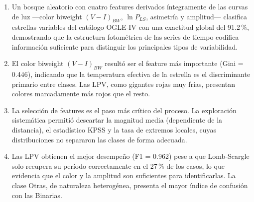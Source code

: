 \documentclass[letterpaper,12pt]{extarticle}
\begin{document}
\begin{enumerate}
    \item Un bosque aleatorio con cuatro features derivados íntegramente de las
    curvas de luz ---color biweight $(V-I)_{BW}$, $\ln P_{LS}$, asimetría y
    amplitud--- clasifica estrellas variables del catálogo OGLE-IV con una
    exactitud global del 91.2\,\%, demostrando que la estructura fotométrica de
    las series de tiempo codifica información suficiente para distinguir los
    principales tipos de variabilidad.

    \item El color biweight $(V-I)_{BW}$ resultó ser el feature más importante
    (Gini = 0.446), indicando que la temperatura efectiva de la estrella es el
    discriminante primario entre clases. Las LPV, como gigantes rojas muy frías,
    presentan colores marcadamente más rojos que el resto.

    \item La selección de features es el paso más crítico del proceso. La
    exploración sistemática permitió descartar la magnitud media (dependiente de
    la distancia), el estadístico KPSS y la tasa de extremos locales, cuyas
    distribuciones no separaron las clases de forma adecuada.

    \item Las LPV obtienen el mejor desempeño (F1 = 0.962) pese a que Lomb-Scargle
    solo recupera su período correctamente en el 27\,\% de los casos, lo que
    evidencia que el color y la amplitud son suficientes para identificarlas. La
    clase Otras, de naturaleza heterogénea, presenta el mayor índice de confusión
    con las Binarias.
\end{enumerate}

\footnotesize


\end{document}
